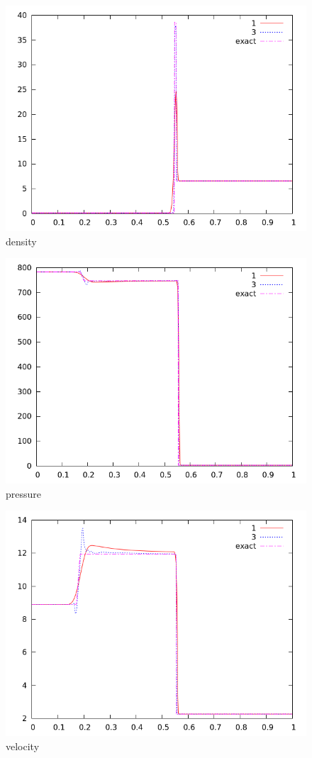 \documentclass[letterpaper,12pt]{article}
\begin{document}
\begin{figure}[h]
  \begin{center}
     \includegraphics[width=.78\textwidth]{den_T9.png}	
  \end{center}
  \caption{density}
\end{figure}

\begin{figure}
  \begin{center}
     \includegraphics[width=.78\textwidth]{prs_T9.png}	
  \end{center}
  \caption{pressure}
\end{figure}

\begin{figure}
  \begin{center}
     \includegraphics[width=.78\textwidth]{vel_T9.png}	
  \end{center}
  \caption{velocity}
\end{figure}
\clearpage
\end{document}

